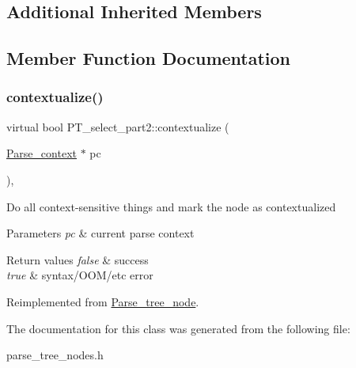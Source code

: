 \subsection*{Additional Inherited Members}


\subsection{Member Function Documentation}
\mbox{\label{classPT__select__part2_aa5b6953b68fed0bc91a7d626db111f78}} 
\subsubsection{\texorpdfstring{contextualize()}{contextualize()}}
{\footnotesize\ttfamily virtual bool P\+T\+\_\+select\+\_\+part2\+::contextualize (\begin{DoxyParamCaption}\item[{\mbox{\hyperlink{structParse__context}{Parse\+\_\+context}} $\ast$}]{pc }\end{DoxyParamCaption})\hspace{0.3cm}{\ttfamily [inline]}, {\ttfamily [virtual]}}

Do all context-\/sensitive things and mark the node as contextualized


\begin{DoxyParams}{Parameters}
{\em pc} & current parse context\\
\hline
\end{DoxyParams}

\begin{DoxyRetVals}{Return values}
{\em false} & success \\
\hline
{\em true} & syntax/\+O\+O\+M/etc error \\
\hline
\end{DoxyRetVals}


Reimplemented from \mbox{\hyperlink{classParse__tree__node_a22d93524a537d0df652d7efa144f23da}{Parse\+\_\+tree\+\_\+node}}.



The documentation for this class was generated from the following file\+:\begin{DoxyCompactItemize}
\item 
parse\+\_\+tree\+\_\+nodes.\+h\end{DoxyCompactItemize}
